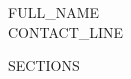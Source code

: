 


\begin{center}
    {\Huge \scshape {{FULL_NAME}}} \\ \vspace{3pt}
    \small {{CONTACT_LINE}}
    \vspace{-8pt}
\end{center}
\par\vspace{1pt}

{{SECTIONS}}


